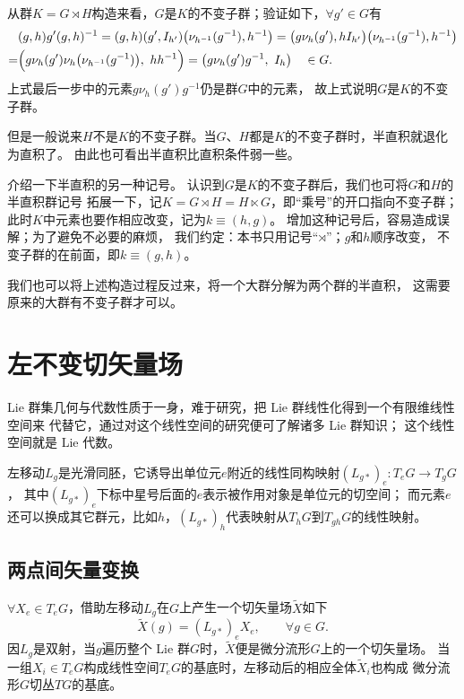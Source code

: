 从群$K=G \rtimes H$构造来看，$G$是$K$的不变子群；验证如下，$\forall g'\in G$有
\begin{align*}
    &(g,h) g' (g,h)^{-1} =
    (g,h) (g' , I_{h'}) \bigl(\nu_{h^{-1}}(g^{-1}), h^{-1} \bigr) =
    \bigl( g \nu_h (g'), h I_{h'}\bigr) \bigl(\nu_{h^{-1}}(g^{-1}), h^{-1}\bigr)  \\
    =& \Bigl(g \nu_h (g') \nu_h \bigl(\nu_{h^{-1}}(g^{-1})\bigr),\  h h^{-1}\Bigr) 
    = \bigl(g \nu_h (g') g^{-1},\ I_h\bigr)  \quad \in G.
\end{align*}
上式最后一步中的元素$g \nu_h (g') g^{-1}$仍是群$G$中的元素，
故上式说明$G$是$K$的不变子群。

但是一般说来$H$不是$K$的不变子群。当$G$、$H$都是$K$的不变子群时，半直积就退化为直积了。
由此也可看出半直积比直积条件弱一些。

介绍一下半直积的另一种记号。
认识到$G$是$K$的不变子群后，我们也可将$G$和$H$的{\kaishu  半直积群}记号
拓展一下，记$K=G  \rtimes H =H \ltimes G$，即“乘号”的开口指向不变子群；
此时$K$中元素也要作相应改变，记为$k\equiv (h,g)$。
增加这种记号后，容易造成误解；为了避免不必要的麻烦，
我们约定：本书只用记号“$\rtimes$”；$g$和$h$顺序改变，
不变子群的在前面，即$k\equiv (g,h)$。



我们也可以将上述构造过程反过来，将一个大群分解为两个群的半直积，
这需要原来的大群有不变子群才可以。








\section{左不变切矢量场}\label{chlg:sec_Left-Invariant-Vector-Fields}
 Lie 群集几何与代数性质于一身，难于研究，把 Lie 群线性化得到一个有限维线性空间来
代替它，通过对这个线性空间的研究便可了解诸多 Lie 群知识；
这个线性空间就是 Lie 代数。

左移动$L_{g}$是光滑同胚，它诱导出单位元$e$附近的线性同构映射$(L_{g*})_e:T_eG\to T_g G$，
其中$(L_{g*})_e$下标中星号后面的$e$表示被作用对象是单位元的切空间；
而元素$e$还可以换成其它群元，比如$h$，$(L_{g*})_h$代表映射从$T_hG$到$T_{gh} G$的线性映射。


\subsection{两点间矢量变换}
$\forall X_e \in T_e G$，借助左移动$L_g$在$G$上产生一个切矢量场$\widetilde{X}$如下
\begin{equation}
    \widetilde{X}(g) = (L_{g*})_e X_e , \qquad \forall g\in G.
\end{equation}
因$L_g$是双射，当$g$遍历整个 Lie 群$G$时，$\widetilde{X}$便是微分流形$G$上的一个切矢量场。
当一组$X_i\in T_eG$构成线性空间$T_eG$的基底时，左移动后的相应全体$\widetilde{X}_i$也构成
微分流形$G$切丛$TG$的基底。

